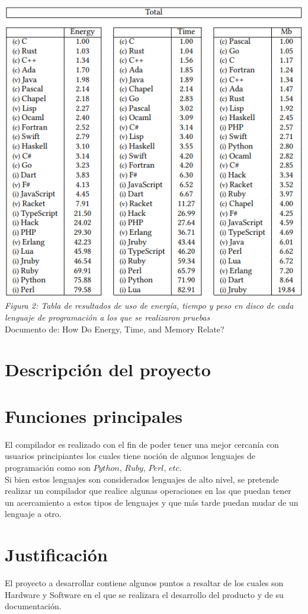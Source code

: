 \documentclass[10pt,executivepaper]{article}
\begin{document}
\begin{center}
  \includegraphics[scale=0.7]{imgs/tabla2.png}
  \\\textit{Figura 2: Tabla de resultados de uso de energía, tiempo y peso en disco de cada lenguaje de programación a los que se realizaron pruebas }\\{\scriptsize Documento de: How Do Energy, Time, and Memory Relate?}
\end{center}
\section{Descripción del proyecto}

\section{Funciones principales}
El compilador es realizado con el fin de poder tener una mejor cercanía con usuarios principiantes los cuales tiene noción de algunos lenguajes de programación como son $Python$, $Ruby$, $Perl$, $etc$.\\Si bien estos lenguajes son considerados lenguajes de alto nivel, se pretende realizar un compilador que realice algunas  operaciones en las que puedan tener un acercamiento a estos tipos de lenguajes y que más tarde puedan mudar de un lenguaje a otro.
\section{Justificación}
El proyecto a desarrollar contiene algunos puntos a resaltar de los cuales son Hardware y Software en el que se realizara el desarrollo del producto y de su documentación.
\end{document}
